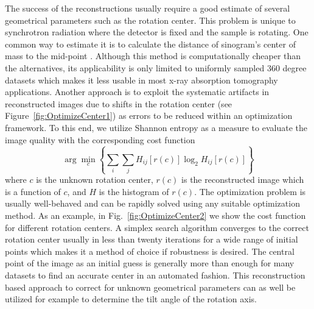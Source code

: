 \documentclass[pdf]{iucr}              %
\begin{document}
The success of the reconstructions usually require a good estimate of several geometrical parameters such as the rotation center. This problem is unique to synchrotron radiation where the detector is fixed and the sample is rotating. One common way to estimate it is to calculate the distance of sinogram's center of mass to the mid-point \cite{Azevedo}. Although this method is computationally cheaper than the alternatives, its applicability is only limited to uniformly sampled 360 degree datasets which makes it less usable in most x-ray absorption tomography applications. Another approach is to exploit the systematic artifacts in reconstructed images due to shifts in the rotation center \cite{donath_spie_2006} (see Figure~\ref{fig:OptimizeCenter1}) as errors to be reduced within an optimization framework. To this end, we utilize Shannon entropy as a measure to evaluate the image quality with the corresponding cost function
\begin{equation}
\arg \min_c \left\{\sum_i \sum_jH_{ij}\left[r(c)\right]\log_2 H_{ij}\left[r(c)\right]\right\}
\end{equation}
where $c$ is the unknown rotation center, $r(c)$ is the reconstructed image which is a function of $c$, and $H$ is the histogram of $r(c)$. The optimization problem is usually well-behaved and can be rapidly solved using any suitable optimization method.  As an example, in Fig.~\ref{fig:OptimizeCenter2} we show the cost function for different rotation centers. A simplex search algorithm converges to the correct rotation center usually in less than twenty iterations for a wide range of initial points which makes it a method of choice if robustness is desired. The central point of the image as an initial guess is generally more than enough for many datasets to find an accurate center in an automated fashion. This reconstruction based approach to correct for unknown geometrical parameters can as well be utilized for example to determine the tilt angle of the rotation axis.
\end{document}
